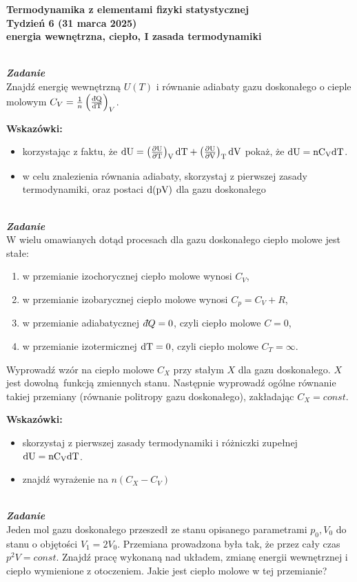 \documentclass[11pt,a4paper]{article}
\newcounter{zadanie}\newcommand{\zadanie}[1][]{\addtocounter{zadanie}{1} ~\\  {\bf \emph{Zadanie \arabic{zadanie} #1 }} \\}
\newcommand{\dbar}{{\mkern3mu\mathchar'26\mkern-12mu d}}
\begin{document}

\begin{centering}
\bf{\Large{Termodynamika z elementami fizyki statystycznej}}\\
Tydzień 6  (31 marca 2025)\\[3mm]
energia wewnętrzna, ciepło, I zasada termodynamiki \\ 
\end{centering} 
\vspace{5mm}

\zadanie
Znajdź energię wewnętrzną $U(T)$ i równanie adiabaty gazu doskonałego o cieple molowym
$C_V = \frac{1}{n}\left( \frac{\rm{\dbar}Q}{\rm{d}T}\right)_V$.

\textbf{Wskazówki:}
\begin{itemize}
  \item korzystając z faktu, że
    $\rm{d}U = \left(\frac{\partial U}{\partial T}\right)_V \rm{d}T + \left(\frac{\partial U}{\partial V}\right)_T \rm{d}V$
    pokaż, że $\rm{d}U = n C_V \rm{d}T$.
  \item w celu znalezienia równania adiabaty, skorzystaj z pierwszej zasady termodynamiki,
    oraz postaci $\rm{d}(pV)$ dla gazu doskonałego\\
\end{itemize}
\zadanie
W wielu omawianych dotąd procesach dla gazu doskonałego ciepło molowe jest stałe:
\begin{enumerate}
\item w przemianie izochorycznej ciepło molowe wynosi $C_V$,
\item w przemianie izobarycznej ciepło molowe wynosi $C_p = C_V + R$,
\item w przemianie adiabatycznej $\dbar Q = 0$, czyli ciepło molowe $C = 0$,
\item w przemianie izotermicznej $\rm{d}T = 0$, czyli ciepło molowe $C_T = \infty$.
\end{enumerate}
Wyprowadź wzór na ciepło molowe $C_X$ przy stałym $X$ dla gazu doskonałego.
$X$ jest dowolną funkcją zmiennych stanu. Następnie wyprowadź ogólne równanie 
takiej przemiany (równanie politropy gazu doskonałego), zakładając $C_X=const$.

\textbf{Wskazówki:}
\begin{itemize}
\item skorzystaj z pierwszej zasady termodynamiki i różniczki zupełnej $\rm{d}U = n C_V \rm{d}T$.
\item znajdź wyrażenie na $n(C_X - C_V)$
\end{itemize}
\zadanie
Jeden mol gazu doskonałego przeszedł ze stanu opisanego parametrami
$p_0, V_0$ do stanu o objętości $V_1 = 2 V_0$.
Przemiana prowadzona była tak, że przez cały czas $p^2 V = const$.
Znajdź pracę wykonaną nad układem, zmianę energii wewnętrznej i ciepło wymienione z otoczeniem.
Jakie jest ciepło molowe w tej przemianie?
\end{document}
